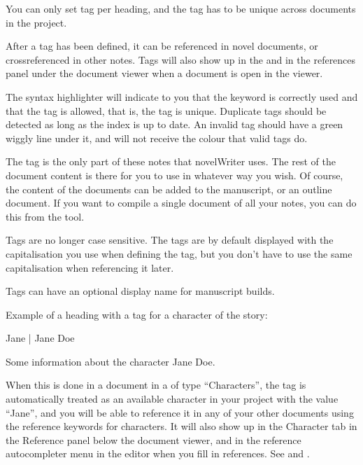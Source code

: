 \documentclass[a4paper,11pt,english]{sphinxmanual}
\begin{document}
\sphinxAtStartPar
You can only set  tag per heading, and the tag has to be unique across  documents in
the project.

\sphinxAtStartPar
After a tag has been defined, it can be referenced in novel documents, or cross\sphinxhyphen{}referenced in other
notes. Tags will also show up in the  and in the references panel under the
document viewer when a document is open in the viewer.

\sphinxAtStartPar
The syntax highlighter will indicate to you that the keyword is correctly used and that the tag is
allowed, that is, the tag is unique. Duplicate tags should be detected as long as the index is up
to date. An invalid tag should have a green wiggly line under it, and will not receive the colour
that valid tags do.

\sphinxAtStartPar
The tag is the only part of these notes that novelWriter uses. The rest of the document content is
there for you to use in whatever way you wish. Of course, the content of the documents can be added
to the manuscript, or an outline document. If you want to compile a single document of all your
notes, you can do this from the  tool.

\sphinxAtStartPar
{}Tags are no longer case sensitive. The tags are by default displayed with the capitalisation you
use when defining the tag, but you don’t have to use the same capitalisation when referencing
it later.

\sphinxAtStartPar
{}Tags can have an optional display name for manuscript builds.

\sphinxAtStartPar
Example of a heading with a tag for a character of the story:

\begin{sphinxVerbatim}[commandchars=\\\{\}]

 Jane | Jane Doe

Some information about the character Jane Doe.
\end{sphinxVerbatim}

\sphinxAtStartPar
When this is done in a document in a {\hyperref[\detokenize{int_glossary:term-Root-Folder}]{}} of type “Characters”, the tag is
automatically treated as an available character in your project with the value “Jane”, and you will
be able to reference it in any of your other documents using the reference keywords for characters.
It will also show up in the Character tab in the Reference panel below the document viewer, and in
the reference auto\sphinxhyphen{}completer menu in the editor when you fill in references. See {\hyperref[\detokenize{usage_writing:a-ui-view}]{}}
and {\hyperref[\detokenize{project_references:a-references-completer}]{}}.
\end{document}
